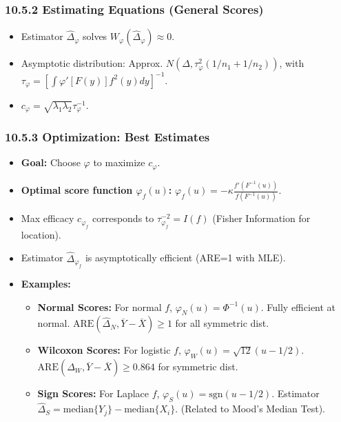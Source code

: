 \subsubsection{10.5.2 Estimating Equations (General Scores)}

\begin{itemize}
	\item Estimator $\widehat{\Delta}_\varphi$ solves $W_\varphi(\widehat{\Delta}_\varphi) \approx 0$.
	\item Asymptotic distribution: Approx. $N(\Delta, \tau_\varphi^2(1/n_1+1/n_2))$, with $\tau_\varphi = [\int \varphi'[F(y)]f^2(y)dy]^{-1}$.
	\item $c_\varphi = \sqrt{\lambda_1\lambda_2}\tau_\varphi^{-1}$.
\end{itemize}

\subsubsection{10.5.3 Optimization: Best Estimates}

\begin{itemize}
	\item \textbf{Goal:} Choose $\varphi$ to maximize $c_\varphi$.
	\item \textbf{Optimal score function $\varphi_f(u)$:} $\varphi_f(u) = -\kappa \frac{f'(F^{-1}(u))}{f(F^{-1}(u))}$.
	\item Max efficacy $c_{\varphi_f}$ corresponds to $\tau_{\varphi_f}^{-2} = I(f)$ (Fisher Information for location).
	\item Estimator $\widehat{\Delta}_{\varphi_f}$ is asymptotically efficient (ARE=1 with MLE).
	\item \textbf{Examples:}
	\begin{itemize}
		\item \textbf{Normal Scores:} For normal $f$, $\varphi_N(u) = \Phi^{-1}(u)$. Fully efficient at normal. $\text{ARE}(\widehat{\Delta}_N, \overline{Y}-\overline{X}) \ge 1$ for all symmetric dist.
		\item \textbf{Wilcoxon Scores:} For logistic $f$, $\varphi_W(u) = \sqrt{12}(u-1/2)$. $\text{ARE}(\widehat{\Delta}_W, \overline{Y}-\overline{X}) \ge 0.864$ for symmetric dist.
		\item \textbf{Sign Scores:} For Laplace $f$, $\varphi_S(u) = \text{sgn}(u-1/2)$. Estimator $\widehat{\Delta}_S = \text{median}\{Y_j\} - \text{median}\{X_i\}$. (Related to Mood's Median Test).
	\end{itemize}
\end{itemize}

